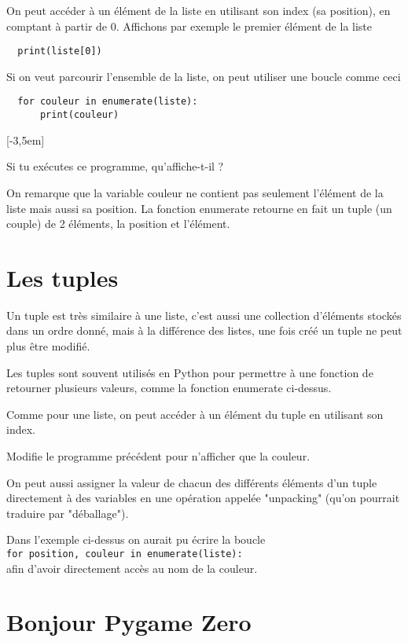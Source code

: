 \documentclass[11pt]{article}
\begin{document}
On peut accéder à un élément de la liste en utilisant son index (sa position), en comptant à partir de 0. Affichons par exemple le premier élément de la liste
\begin{lstlisting}
  print(liste[0])
\end{lstlisting}

Si on veut parcourir l'ensemble de la liste, on peut utiliser une boucle comme ceci
\begin{lstlisting}
  for couleur in enumerate(liste):
      print(couleur)
\end{lstlisting}
\marginnote{\textcolor{deepblue}{for~=~pour\\in~=~dans\\enumerate~=énumérer}}[-3,5em]

Si tu exécutes ce programme, qu'affiche-t-il ?

On remarque que la variable couleur ne contient pas seulement l'élément de la liste mais aussi sa position. La fonction enumerate retourne en fait un tuple (un couple) de 2 éléments, la position et l'élément.

\section{Les tuples}

Un tuple est très similaire à une liste, c'est aussi une collection d'éléments stockés dans un ordre donné, mais à la différence des listes, une fois créé un tuple ne peut plus être modifié.

Les tuples sont souvent utilisés en Python pour permettre à une fonction de retourner plusieurs valeurs, comme la fonction enumerate ci-dessus.

Comme pour une liste, on peut accéder à un élément du tuple en utilisant son index.

Modifie le programme précédent pour n'afficher que la couleur.

On peut aussi assigner la valeur de chacun des différents éléments d'un tuple directement à des variables en une opération appelée "unpacking" (qu'on pourrait traduire par "déballage").

Dans l'exemple ci-dessus on aurait pu écrire la boucle\\
\lstinline{for position, couleur in enumerate(liste):}\\
afin d'avoir directement accès au nom de la couleur.

\section{Bonjour Pygame Zero}
\end{document}
